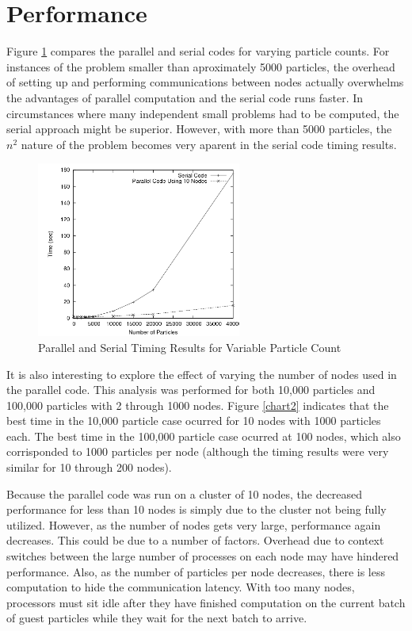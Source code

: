 \documentclass{article}
\begin{document}
\section{Performance}
Figure \ref{chart1} compares the parallel and serial codes for varying particle counts. For instances of the problem smaller than aproximately 5000 particles, the overhead of setting up and performing communications between nodes actually overwhelms the advantages of parallel computation and the serial code runs faster. In circumstances where many independent small problems had to be computed, the serial approach might be superior. However, with more than 5000 particles, the \(n^2\) nature of the problem becomes very aparent in the serial code timing results.

\begin{figure}
\centering
\includegraphics[width=0.6\textwidth]{img/timing_data_variable_particles.png}
\caption{Parallel and Serial Timing Results for Variable Particle Count}
\label{chart1}
\end{figure}

It is also interesting to explore the effect of varying the number of nodes used in the parallel code. This analysis was performed for both 10,000 particles and 100,000 particles with 2 through 1000 nodes. Figure \ref{chart2} indicates that the best time in the 10,000 particle case ocurred for 10 nodes with 1000 particles each. The best time in the 100,000 particle case ocurred at 100 nodes, which also corrisponded to 1000 particles per node (although the timing results were very similar for 10 through 200 nodes).

Because the parallel code was run on a cluster of 10 nodes, the decreased performance for less than 10 nodes is simply due to the cluster not being fully utilized. However, as the number of nodes gets very large, performance again decreases. This could be due to a number of factors. Overhead due to context switches between the large number of processes on each node may have hindered performance. Also, as the number of particles per node decreases, there is less computation to hide the communication latency. With too many nodes, processors must sit idle after they have finished computation on the current batch of guest particles while they wait for the next batch to arrive.
\end{document}
